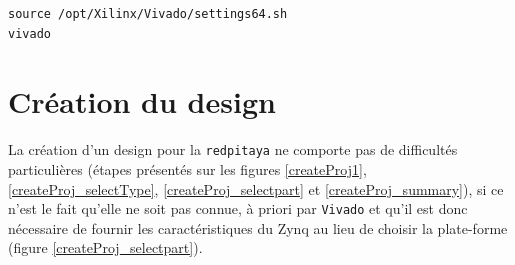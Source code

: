 \documentclass[12pt,oneside]{article}
\begin{document}
\begin{lstlisting}
source /opt/Xilinx/Vivado/settings64.sh
vivado
\end{lstlisting}

\section{Cr\'eation du design}

La cr\'eation d'un design pour la {\tt redpitaya} ne comporte pas de
difficult\'es particuli\`eres (\'etapes pr\'esent\'es sur les figures
\ref{createProj1}, \ref{createProj_selectType}, \ref{createProj_selectpart} et
\ref{createProj_summary}),
si ce n'est le fait qu'elle ne soit pas connue,
\`a priori par {\tt Vivado} et qu'il est donc n\'ecessaire de fournir les
caract\'eristiques du Zynq au lieu de choisir la plate-forme (figure
\ref{createProj_selectpart}).
\end{document}
